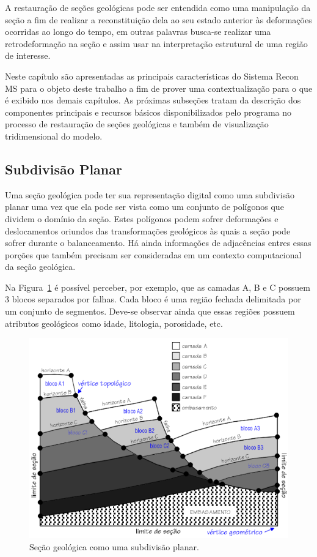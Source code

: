 A restauração de seções geológicas pode ser entendida como uma manipulação da seção a fim de realizar a reconstituição dela ao seu estado anterior às deformações ocorridas ao longo do tempo, em outras palavras busca-se realizar uma retrodeformação na seção e assim usar na interpretação estrutural de uma região de interesse.\cite{Fossen}

Neste capítulo são apresentadas as principais características do Sistema Recon MS para o objeto deste trabalho a fim de prover uma contextualização para o que é exibido nos demais capítulos. As próximas subseções tratam da descrição dos componentes principais e recursos básicos disponibilizados pelo programa no processo de restauração de seções geológicas e também de visualização tridimensional do modelo. 

\subsection{Subdivisão Planar} %

Uma seção geológica pode ter sua representação digital como uma subdivisão planar uma vez que ela pode ser vista como um conjunto de polígonos que dividem o domínio da seção. Estes polígonos podem sofrer deformações e deslocamentos oriundos das transformações geológicos às quais a seção pode sofrer durante o balanceamento. Há ainda informações de adjacências entres essas porções que também precisam ser consideradas em um contexto computacional da seção geológica.

Na Figura~\ref{fig-subdivisao-planar} é possível perceber, por exemplo, que as camadas A, B e C possuem 3 blocos separados por falhas. Cada bloco é uma região fechada delimitada por um conjunto de segmentos. Deve-se observar ainda que essas regiões possuem atributos geológicos como idade, litologia, porosidade, etc.

\begin{figure} [h]
  \begin{center}
    \includegraphics[width=400pt]{images/fig-subdivisao-planar}
    \caption{Seção geológica como uma subdivisão planar.\cite{Ferraz}}\label{fig-subdivisao-planar}
  \end{center}
\end{figure}

